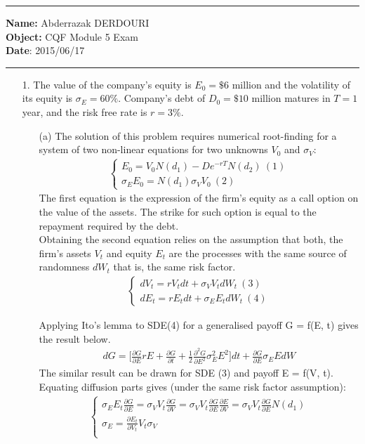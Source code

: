 \documentclass[11pt,oneside,a4paper, titlepage]{article}
\begin{document}
\hrule height 1pt
\vskip 0.2cm
\noindent \textbf{Name:} Abderrazak \textsc{DERDOURI}\\
\textbf{Object:} CQF Module 5 Exam\\
\textbf{Date}: 2015/06/17
\vskip 0.2cm
\hrule height 1pt

\begin{enumerate}
\item[1.]	
The value of the company's equity is \(E_0=\$6\) million and the volatility of its equity is \(\sigma_E=60\%\). Company's debt of
\(D_0=\$10\) million matures in \(T=1\) year, and the risk free rate is \(r=3\%\). 
\begin{enumerate}
		\item[(a)] 		
The solution of this problem requires numerical root-finding for a system of two non-linear equations for two unknowns \(V_0\) and \(\sigma_V\):
\begin{eqnarray*}
	\left\{ \begin{array}{ll}
		E_0 = V_0 N(d_1) - D e^{-rT} N(d_2) \ (1)\\
		\sigma_E E_0 = N(d_1)\sigma_V V_0 \ (2)
	\end{array} \right.	
\end{eqnarray*}
The first equation is the expression of the firm's equity as a call option on the value of the assets. 
The strike for such option is equal to the repayment required by the debt.\\

Obtaining the second equation relies on the assumption that both, the firm's assets \(V_t\) and equity \(E_t\) are the processes
with the same source of randomness \(dW_t\) that is, the same risk factor.
\begin{eqnarray*}
	\left\{ \begin{array}{ll}			
	dV_t = rV_t dt + \sigma_V V_t dW_t \ (3)\\
	dE_t = rE_t dt + \sigma_E E_t dW_t \ (4)
	\end{array} \right.	
\end{eqnarray*}

Applying Ito's lemma to SDE(4) for a generalised payoff G = f(E, t) gives the result below.
\begin{eqnarray*}
dG=\bigg[\frac{\partial G}{\partial E} r E + \frac{\partial G}{\partial t} + \frac{1}{2}\frac{\partial^2 G}{\partial E^2} \sigma_E^2 E^2 \bigg] dt
+\frac{\partial G}{\partial E} \sigma_E E dW
\end{eqnarray*}
The similar result can be drawn for SDE (3) and payoff E = f(V, t). Equating diffusion parts gives (under the same risk factor assumption):
\begin{eqnarray*}
	\left\{ \begin{array}{ll}		
	\sigma_E E_t \frac{\partial G}{\partial E} = \sigma_V V_t \frac{\partial G}{\partial V} = \sigma_V V_t \frac{\partial G}{\partial E} \frac{\partial E}{\partial V} = \sigma_V V_t \frac{\partial G}{\partial E} N(d_1)\\
	\sigma_E = \frac{\partial E_t}{\partial V_t} V_t \sigma_V \\
	\end{array} \right.	
\end{eqnarray*}


\end{enumerate}
\end{enumerate}
\end{document}
